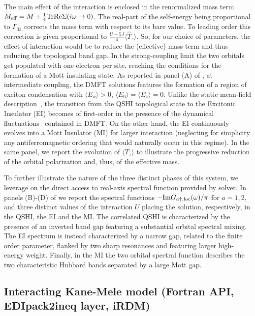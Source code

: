 \documentclass[edipack_sp.tex]{subfiles}
\begin{document}
%
The main effect of the interaction is enclosed in the renormalized
mass term $M_\mathrm{eff}=M+\tfrac{1}{4}{\rm Tr}{{\rm Re}\Sigma(i\omega\to0)}$. The
real-part of the self-energy being proportional to $\Gamma_{03}$
corrects the mass term with respect to its bare value. To leading
order this correction is given proportional to $\tfrac{U-5J}{4}\langle
\hat{T}_z\rangle$. So, for our choice of parameters, the effect of
interaction would be to reduce the (effective) mass term and thus
reducing the topological band gap. In the strong-coupling limit the
two orbitals get populated with one electron per site, reaching the
conditions for the formation of a Mott insulating state.
As reported in panel (A) of , at intermediate coupling,
the DMFT solutions features the formation of a
region of exciton condensation with $\langle E_x\rangle>0$, $\langle
E_0\rangle=\langle E_z\rangle=0$. 
Unlike the static mean-field description~\cite{Blason}, the
transition from the QSHI topological state to the Excitonic Insulator 
(EI) becomes of first-order in the presence of the dynamical fluctuations~\cite{Continentino,Paoletti,BellomiaKMH} contained in DMFT. On the
other hand, the EI continuously evolves into a Mott Insulator (MI)
for larger interaction (neglecting for simplicity any 
antiferromagnetic ordering that would naturally occur in this
regime).
In the same panel, we report the evolution of 
$\langle T_z\rangle$ to illustrate the progressive reduction of the
orbital polarization and, thus, of the effective mass. 


To further illustrate the nature of the three distinct phases of this
system, we leverage on the direct access to real-axis spectral
function provided by \NAME solver. In panels (B)-(D) of 
we report the spectral functions $-{\rm Im}{G}_{a\uparrow,\mathrm{loc}}(\omega)/\pi$ for
$a=1,2$, and three distinct values of the interaction
$U$ placing the solution, respectively, in the QSHI, the EI and the MI.
The correlated QSHI is characterized by the presence of an 
inverted band gap featuring a substantial orbital spectral mixing. The
EI spectrum is instead characterized by a narrow gap, related to the
finite order parameter, flanked by two sharp resonances and featuring
larger high-energy weight.
Finally, in the MI the two orbital spectral function describes the two 
characteristic Hubbard bands separated by a large Mott gap.  

\subsection{Interacting Kane-Mele model (Fortran API, EDIpack2ineq layer, iRDM)}
\end{document}
